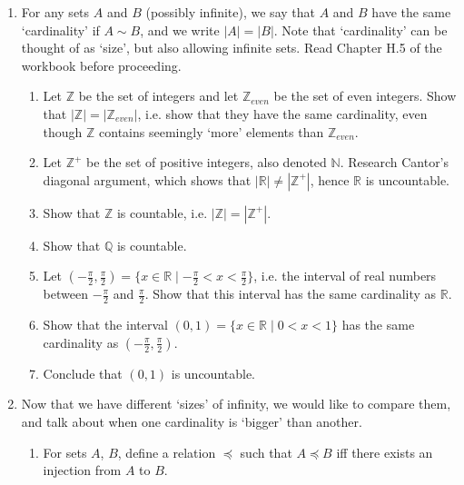 \documentclass[a4paper,12pt]{article}
\newcommand{\Z}{\mathbb{Z}}
\newcommand{\N}{\mathbb{N}}
\newcommand{\Q}{\mathbb{Q}}
\newcommand{\R}{\mathbb{R}}
\begin{document}
\begin{enumerate}
\item
For any sets $A$ and $B$ (possibly infinite), we say that $A$ and $B$ have the
same `cardinality' if $A \sim B$, and we write $|A|=|B|$.
Note that `cardinality' can be thought of as `size', but also allowing infinite
sets. Read Chapter H.5 of the workbook before proceeding.
\begin{enumerate}
\item Let $\Z$ be the set of integers and let $\Z_{even}$ be the set of even
integers. Show that $|\Z| = |\Z_{even}|$, i.e. show that they have the
same cardinality, even though $\Z$ contains seemingly `more' elements than
$\Z_{even}$.
\item Let $\Z^+$ be the set of positive integers, also denoted $\N$.
Research Cantor's diagonal argument, which shows that $|\R| \neq |\Z^+|$,
hence $\R$ is uncountable.
\item Show that $\Z$ is countable, i.e. $|\Z| = |\Z^+|$.
\item Show that $\Q$ is countable.
\item Let $(-\frac{\pi}{2}, \frac{\pi}{2}) = \{x \in \R \mid -\frac{\pi}{2}
< x < \frac{\pi}{2}\}$, i.e. the interval of
real numbers between $-\frac{\pi}{2}$ and $\frac{\pi}{2}$. Show that this
interval has the same cardinality as $\R$.
\item Show that the interval $(0, 1) = \{x \in \R \mid 0 < x < 1\}$ has the
same cardinality as $(-\frac{\pi}{2}, \frac{\pi}{2})$.
\item Conclude that $(0, 1)$ is uncountable.
\end{enumerate}

\item Now that we have different `sizes' of infinity, we would like to compare
them, and talk about when one cardinality is `bigger' than another.

\begin{enumerate}
\item
For sets $A$, $B$, define a relation $\preceq$ such that $A \preceq B$ iff
there exists an injection from $A$ to $B$.


\end{enumerate}
\end{enumerate}
\end{document}
